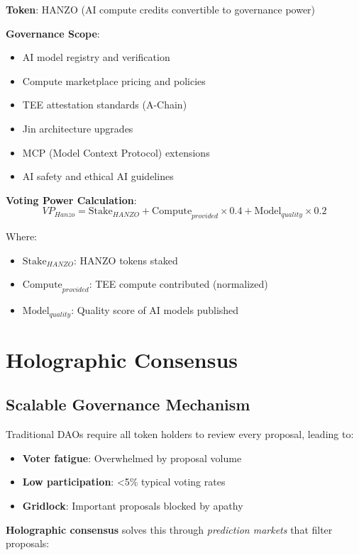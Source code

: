 \documentclass[11pt,a4paper]{article}
\begin{document}
\textbf{Token}: HANZO (AI compute credits convertible to governance power)

\textbf{Governance Scope}:
\begin{itemize}
\item AI model registry and verification
\item Compute marketplace pricing and policies
\item TEE attestation standards (A-Chain)
\item Jin architecture upgrades
\item MCP (Model Context Protocol) extensions
\item AI safety and ethical AI guidelines
\end{itemize}

\textbf{Voting Power Calculation}:
\begin{equation}
VP_{Hanzo} = \text{Stake}_{HANZO} + \text{Compute}_{provided} \times 0.4 + \text{Model}_{quality} \times 0.2
\end{equation}

Where:
\begin{itemize}
\item $\text{Stake}_{HANZO}$: HANZO tokens staked
\item $\text{Compute}_{provided}$: TEE compute contributed (normalized)
\item $\text{Model}_{quality}$: Quality score of AI models published
\end{itemize}

\section{Holographic Consensus}

\subsection{Scalable Governance Mechanism}

Traditional DAOs require all token holders to review every proposal, leading to:
\begin{itemize}
\item \textbf{Voter fatigue}: Overwhelmed by proposal volume
\item \textbf{Low participation}: <5\% typical voting rates
\item \textbf{Gridlock}: Important proposals blocked by apathy
\end{itemize}

\textbf{Holographic consensus} solves this through \emph{prediction markets} that filter proposals:
\end{document}
